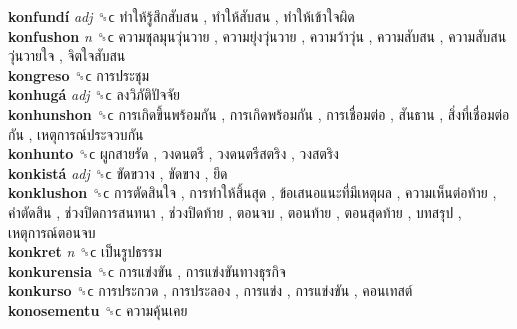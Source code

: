 \textbf{konfundí} \emph{adj}  ␝ϲ   ทำให้รู้สึกสับสน ,  ทำให้สับสน ,  ทำให้เข้าใจผิด   \\
\textbf{konfushon} \emph{n}  ␝ϲ   ความชุลมุนวุ่นวาย ,  ความยุ่งวุ่นวาย ,  ความว้าวุ่น ,  ความสับสน ,  ความสับสนวุ่นวายใจ ,  จิตใจสับสน   \\
\textbf{kongreso} ␝ϲ   การประชุม   \\
\textbf{konhugá} \emph{adj}  ␝ϲ   ลงวิภัติปัจจัย   \\
\textbf{konhunshon} ␝ϲ   การเกิดขึ้นพร้อมกัน ,  การเกิดพร้อมกัน ,  การเชื่อมต่อ ,  สันธาน ,  สิ่งที่เชื่อมต่อกัน ,  เหตุการณ์ประจวบกัน   \\
\textbf{konhunto} ␝ϲ   ผูกสายรัด ,  วงดนตรี ,  วงดนตรีสตริง ,  วงสตริง   \\
\textbf{konkistá} \emph{adj}  ␝ϲ   ขัดขวาง ,  ขัดขาง ,  ยึด   \\
\textbf{konklushon} ␝ϲ   การตัดสินใจ ,  การทำให้สิ้นสุด ,  ข้อเสนอแนะที่มีเหตุผล ,  ความเห็นต่อท้าย ,  คำตัดสิน ,  ช่วงปิดการสนทนา ,  ช่วงปิดท้าย ,  ตอนจบ ,  ตอนท้าย ,  ตอนสุดท้าย ,  บทสรุป ,  เหตุการณ์ตอนจบ   \\
\textbf{konkret} \emph{n}  ␝ϲ   เป็นรูปธรรม   \\
\textbf{konkurensia} ␝ϲ   การแข่งขัน ,  การแข่งขันทางธุรกิจ   \\
\textbf{konkurso} ␝ϲ   การประกวด ,  การประลอง ,  การแข่ง ,  การแข่งขัน ,  คอนเทสต์   \\
\textbf{konosementu} ␝ϲ   ความคุ้นเคย   \\
